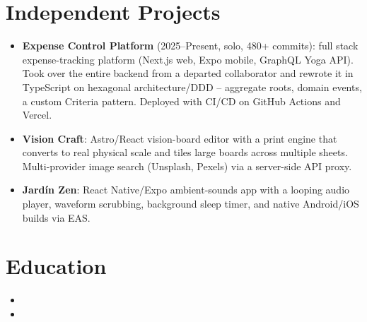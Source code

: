 \documentclass[11pt,a4paper,sans]{moderncv}
\begin{document}
\section{Independent Projects}
\vspace{1pt}
\begin{itemize}

\item \textbf{Expense Control Platform} (2025--Present, solo, 480+ commits): full stack expense-tracking platform (Next.js web, Expo mobile, GraphQL Yoga API). Took over the entire backend from a departed collaborator and rewrote it in TypeScript on hexagonal architecture/DDD -- aggregate roots, domain events, a custom Criteria pattern. Deployed with CI/CD on GitHub Actions and Vercel.

\item \textbf{Vision Craft}: Astro/React vision-board editor with a print engine that converts to real physical scale and tiles large boards across multiple sheets. Multi-provider image search (Unsplash, Pexels) via a server-side API proxy.

\item \textbf{Jard\'in Zen}: React Native/Expo ambient-sounds app with a looping audio player, waveform scrubbing, background sleep timer, and native Android/iOS builds via EAS.

\end{itemize}


\section{Education}
\vspace{1pt}
\begin{itemize}

\item{}

\vspace{3pt}

\item{}

\end{itemize}

\end{document}
